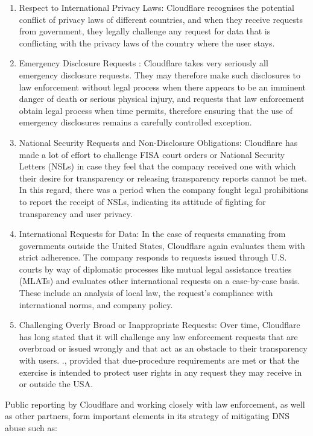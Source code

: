 \begin{enumerate}
\begin{enumerate}
 \item Respect to International Privacy Laws: Cloudflare recognises the potential conflict of privacy laws of different countries, and when they receive requests from government, they legally challenge any request for data that is conflicting with the privacy laws of the country where the user stays.

 \item Emergency Disclosure Requests : Cloudflare takes very seriously all emergency disclosure requests. They may therefore make such disclosures to law enforcement without legal process when there appears to be an imminent danger of death or serious physical injury, and requests that law enforcement obtain legal process when time permits, therefore ensuring that the use of emergency disclosures remains a carefully controlled exception.

 \item  National Security Requests and Non-Disclosure Obligations: Cloudflare has made a lot of effort to challenge FISA court orders or National Security Letters (NSLs) in case they feel that the company received one with which their desire for transparency or releasing transparency reports cannot be met. In this regard, there was a period when the company fought legal prohibitions to report the receipt of NSLs, indicating its attitude of fighting for transparency and user privacy.

 \item  International Requests for Data: In the case of requests emanating from governments outside the United States, Cloudflare again evaluates them with strict adherence. The company responds to requests issued through U.S. courts by way of diplomatic processes like mutual legal assistance treaties (MLATs) and evaluates other international requests on a case-by-case basis. These include an analysis of local law, the request's compliance with international norms, and company policy.

 \item  Challenging Overly Broad or Inappropriate Requests: Over time, Cloudflare has long stated that it will challenge any law enforcement requests that are overbroad or issued wrongly and that act as an obstacle to their transparency with users. ., provided that due-procedure requirements are met or that the exercise is intended to protect user rights in any request they may receive in or outside the USA.
\end{enumerate}

Public reporting by Cloudflare and working closely with law enforcement, as well as other partners, form important elements in its strategy of mitigating DNS abuse such as: 


\end{enumerate}
